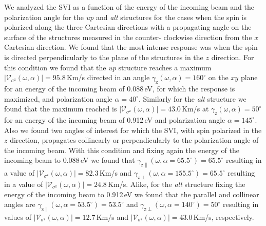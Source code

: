 \documentclass[prb,11pt,tightenlines,twocolumn,aps]{revtex4-1}
\begin{document}
We analyzed the SVI as a function of the energy of the incoming beam and the
polarization angle for the \emph{up} and \emph{alt} structures for the cases
when the spin is polarized along the three Cartesian directions with a
propagating angle on the surface of the structures measured in the counter-%
clockwise direction from the $x$ Cartesian direction. We found that the most
intense response was when the spin is directed perpendicularly to the plane of
the structures in the $z$ direction.
% 
For this condition we found that the \emph{up} structure reaches a maximum
$|\mathcal{V}_{\sigma^{\mathrm{z}}} (\omega,\alpha)| = 95.8$\,Km/s directed in
an angle $\gamma_{\mathrm{z}} (\omega,\alpha) = 160^{\circ}$ on the $xy$ plane
for an energy of the incoming beam of 0.088\,eV, for which the response is
maximized, and polarization angle $\alpha
= 40^{\circ}$.
% 
Similarly for the \emph{alt} structure we found that the maximum reached is $|
\mathcal{V}_{\sigma^{\mathrm{z}}} (\omega,\alpha)| = 43.0$\,Km/s at $\gamma_{
\mathrm{z}} (\omega,\alpha) = 50^{\circ}$ for an energy of the incoming beam of
0.912\,eV and polarization angle $\alpha = 145^{\circ}$.
% 
Also we found two angles of interest for which the SVI, with spin polarized in
the $z$ direction, propagates collinearly or perpendicularly to the
polarization angle of the incoming beam. With this condition and fixing again
the energy of the incoming beam to 0.088\,eV we found that
$\gamma_{\mathrm{z}\parallel} (\omega,\alpha=65.5^{\circ}) = 65.5^{\circ}$
resulting in a value of $|\mathcal{V}_{\sigma^{\mathrm{z}}} (\omega,\alpha)| =
82.3$\,Km/s and $\gamma_{\mathrm{z}\perp} (\omega,\alpha = 155.5^{\circ}) =
65.5^{\circ}$ resulting in a value of $|\mathcal{V}_{\sigma^{\mathrm{z}}}
(\omega,\alpha)| = 24.8$\,Km/s.
% 
Alike, for the \emph{alt} structure fixing the energy of the incoming
beam to 0.912\,eV we found that the parallel and collinear angles are $\gamma_{
\mathrm{z}\parallel} (\omega,\alpha = 53.5^{\circ}) = 53.5^{\circ}$ and
$\gamma_{\mathrm{z}\perp} (\omega,\alpha = 140^{\circ}) = 50^{\circ}$ resulting
in values of $|\mathcal{V}_{\sigma^{\mathrm{z}}}(\omega,\alpha)| = 12.7$\,Km/s
and $|\mathcal{V}_{\sigma^{\mathrm{z}}}(\omega,\alpha)| = 43.0$\,Km/s,
respectively.
\end{document}
